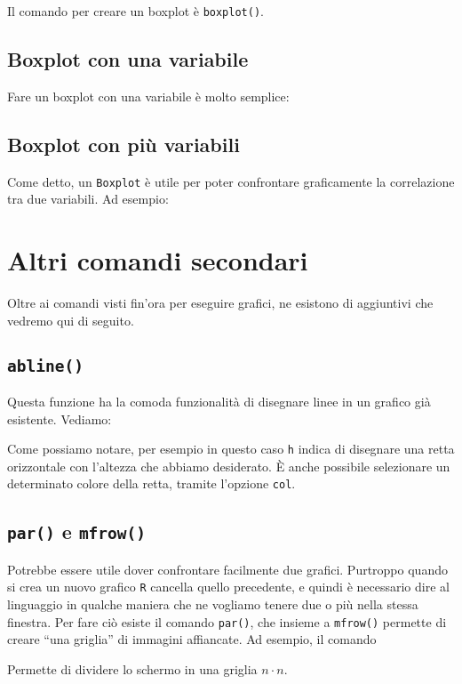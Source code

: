 Il comando per creare un boxplot è \texttt{boxplot()}.

\subsection{Boxplot con una variabile}

Fare un boxplot con una variabile è molto semplice:



\subsection{Boxplot con più variabili}

Come detto, un \texttt{Boxplot} è utile per poter confrontare graficamente la 
correlazione tra due variabili. Ad esempio:



\section{Altri comandi secondari}

Oltre ai comandi visti fin'ora per eseguire grafici, ne esistono di aggiuntivi
che vedremo qui di seguito.

\subsection{\texttt{abline()}}

Questa funzione ha la comoda funzionalità di disegnare linee in un grafico già
esistente. Vediamo:



Come possiamo notare, per esempio in questo caso \texttt{h} indica di disegnare
una retta orizzontale con l'altezza che abbiamo desiderato.
È anche possibile selezionare un determinato colore della retta, tramite
l'opzione \texttt{col}.

\subsection{\texttt{par()} e \texttt{mfrow()}}

Potrebbe essere utile dover confrontare facilmente due grafici. Purtroppo 
quando si crea un nuovo grafico \texttt{R} cancella quello precedente, e quindi 
è necessario dire al linguaggio in qualche maniera che ne vogliamo tenere due o 
più nella stessa finestra.
Per fare ciò esiste il comando \texttt{par()}, che insieme a \texttt{mfrow()} 
permette di creare ``una griglia'' di immagini affiancate.
Ad esempio, il comando



Permette di dividere lo schermo in una griglia $n \cdot n$.